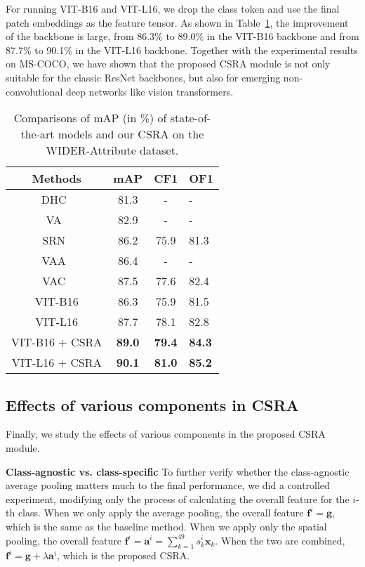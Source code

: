 \documentclass[10pt,twocolumn,letterpaper]{article}
\begin{document}
For running VIT-B16 and VIT-L16, we drop the class token and use the final patch embeddings as the feature tensor. As shown in Table~\ref{tab:wider}, the improvement of the backbone is large, from 86.3\% to 89.0\% in the VIT-B16 backbone and from 87.7\% to 90.1\% in the VIT-L16 backbone. Together with the experimental results on MS-COCO, we have shown that the proposed CSRA module is not only suitable for the classic ResNet backbones, but also for emerging non-convolutional deep networks like vision transformers.

\begin{table}
	\caption{Comparisons of mAP (in \%) of state-of-the-art models and our CSRA on the WIDER-Attribute dataset.}
	\label{tab:wider}
	\centering
	\small
		\begin{tabular}{c|c|c|l}
			\hline
			Methods                    & mAP           & CF1           & OF1           \\ \hline\hline
			DHC~\cite{Wider} & 81.3          & -             & -             \\
			VA~\cite{VA_wider}         & 82.9          & -             & -             \\
			SRN~\cite{2017_CVPR_SRN}   & 86.2          & 75.9          & 81.3          \\
			VAA~\cite{2018_ECCV_CAM}       & 86.4          & -             & -             \\
			VAC~\cite{2019_CVPR_VA}    & 87.5          & 77.6          & 82.4          \\
			\hline
			VIT-B16                    & 86.3          & 75.9          & 81.5          \\
			VIT-L16                    & 87.7          & 78.1          & 82.8          \\
			VIT-B16 + CSRA          & \textbf{89.0} & \textbf{79.4} & \textbf{84.3} \\
			VIT-L16 + CSRA          & \textbf{90.1} & \textbf{81.0} & \textbf{85.2} \\
			\hline
		\end{tabular}
\end{table}

\subsection{Effects of various components in CSRA}

Finally, we study the effects of various components in the proposed CSRA module.

\vspace{6pt}\noindent\textbf{Class-agnostic vs. class-specific} To further verify whether the class-agnostic average pooling matters much to the final performance, we did a controlled experiment, modifying only the process of calculating the overall feature for the $i$-th class. When we only apply the average pooling, the overall feature $\mathbf{f}^i=\mathbf{g}$, which is the same as the baseline method. When we apply only the spatial pooling, the overall feature $\mathbf{f}^i=\mathbf{a}^i=\sum_{k=1}^{49} s_k^i\mathbf{x}_k$. When the two are combined, $\mathbf{f}^i=\mathbf{g}+\lambda \mathbf{a}^i$, which is the proposed CSRA.
\end{document}
